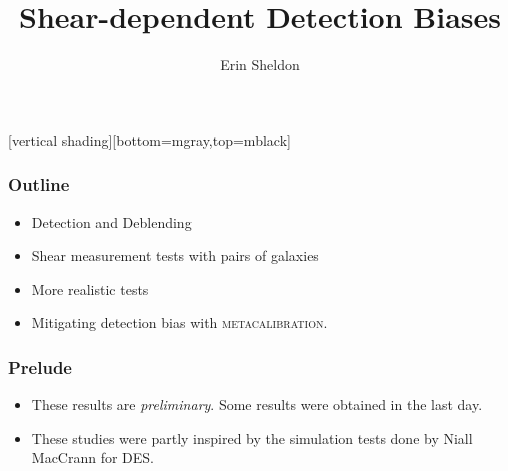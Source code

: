 \documentclass{beamer}
\title{Shear-dependent Detection Biases}
\author{Erin Sheldon}
\institute{Brookhaven National Laboratory}
\newcommand{\mcal}{\textsc{metacalibration}}
\begin{document}
\frame
{
}




\frame{\titlepage}

[vertical shading][bottom=mgray,top=mblack]





\frame
{
    \frametitle{Outline}

    \begin{itemize}

        \item Detection and Deblending
        \item Shear measurement tests with pairs of galaxies
        \item More realistic tests
        \item Mitigating detection bias with \mcal.

    \end{itemize}

}

\frame
{
    \frametitle{Prelude}

 
    \begin{itemize}

        \item These results are {\em preliminary}.  Some results were obtained
            in the last day.

        \item These studies were partly inspired by the simulation tests
            done by Niall MacCrann for DES.

    \end{itemize}

}
\end{document}
